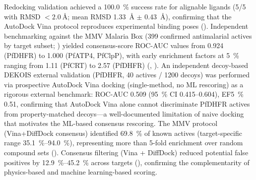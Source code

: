 \documentclass[journal=jcisd8,manuscript=article]{achemso}
\begin{document}
Redocking validation achieved a \qty{100.0}{\percent} success rate for alignable ligands (5/5 with RMSD $< \qty{2.0}{\angstrom}$; mean RMSD \qty{1.33}{\angstrom} $\pm$ \qty{0.43}{\angstrom}), confirming that the AutoDock Vina protocol reproduces experimental binding poses (). Independent benchmarking against the MMV Malaria Box (\num{399} confirmed antimalarial actives by target subset; ) yielded consensus-score ROC-AUC values from \num{0.924} (PfDHFR) to \num{1.000} (PfATP4, PfClpP), with early enrichment factors at \qty{5}{\percent} ranging from \num{1.11} (PfCRT) to \num{2.57} (PfDHFR) (, ). An independent decoy-based DEKOIS external validation (PfDHFR, \num{40} actives / \num{1200} decoys) was performed via prospective AutoDock Vina docking (single-method, no ML rescoring) as a rigorous external benchmark: ROC-AUC \num{0.509} (\qty{95}{\percent} CI \numrange{0.415}{0.604}), EF\qty{5}{\percent} \num{0.51}, confirming that AutoDock Vina alone cannot discriminate PfDHFR actives from property-matched decoys---a well-documented limitation of naive docking \cite{Bauer2013} that motivates the ML-based consensus rescoring. The MMV protocol (Vina+DiffDock consensus) identified \qty{69.8}{\percent} of known actives (target-specific range \qtyrange{35.1}{94.0}{\percent}), representing more than \num{5}-fold enrichment over random compound sets (). Consensus filtering (Vina + DiffDock) reduced potential false positives by \qtyrange{12.9}{45.2}{\percent} across targets (), confirming the complementarity of physics-based and machine learning-based scoring.
\end{document}
